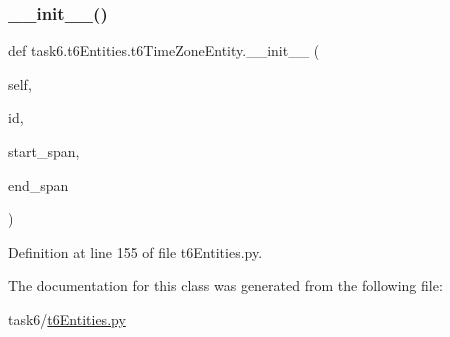 \subsubsection{\texorpdfstring{\+\_\+\+\_\+init\+\_\+\+\_\+()}{\_\_init\_\_()}}
{\footnotesize\ttfamily def task6.\+t6\+Entities.\+t6\+Time\+Zone\+Entity.\+\_\+\+\_\+init\+\_\+\+\_\+ (\begin{DoxyParamCaption}\item[{}]{self,  }\item[{}]{id,  }\item[{}]{start\+\_\+span,  }\item[{}]{end\+\_\+span }\end{DoxyParamCaption})}



Definition at line 155 of file t6\+Entities.\+py.



The documentation for this class was generated from the following file\+:\begin{DoxyCompactItemize}
\item 
task6/\hyperlink{t6Entities_8py}{t6\+Entities.\+py}\end{DoxyCompactItemize}
